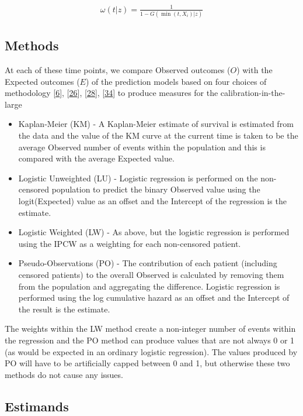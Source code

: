 \documentclass[12pt,PhD,twoside,openright]{muthesis}
\providecommand{\tightlist}{%
  \setlength{\itemsep}{0pt}\setlength{\parskip}{0pt}}
\begin{document}
\[
\begin{array}{c}
\omega(t|z) = \frac{1}{1 - G(\min(t,X_i)|z)}
\end{array}
\]

\hypertarget{methods-4}{%
\subsection{Methods}\label{methods-4}}

At each of these time points, we compare Observed outcomes (\(O\)) with the Expected outcomes (\(E\)) of the prediction models based on four choices of methodology {[}\protect\hyperlink{ref-riley_prognosis_2019}{6}{]}, {[}\protect\hyperlink{ref-royston_tools_2014}{26}{]}, {[}\protect\hyperlink{ref-royston_tools_2015}{28}{]}, {[}\protect\hyperlink{ref-andersen_pseudo-observations_2010}{34}{]} to produce measures for the calibration-in-the-large
\begin{itemize}
\tightlist
\item
  Kaplan-Meier (KM) - A Kaplan-Meier estimate of survival is estimated from the data and the value of the KM curve at the current time is taken to be the average Observed number of events within the population and this is compared with the average Expected value.
\item
  Logistic Unweighted (LU) - Logistic regression is performed on the non-censored population to predict the binary Observed value using the logit(Expected) value as an offset and the Intercept of the regression is the estimate.
\item
  Logistic Weighted (LW) - As above, but the logistic regression is performed using the IPCW as a weighting for each non-censored patient.
\item
  Pseudo-Observations (PO) - The contribution of each patient (including censored patients) to the overall Observed is calculated by removing them from the population and aggregating the difference. Logistic regression is performed using the log cumulative hazard as an offset and the Intercept of the result is the estimate.
\end{itemize}
The weights within the LW method create a non-integer number of events within the regression and the PO method can produce values that are not always 0 or 1 (as would be expected in an ordinary logistic regression). The values produced by PO will have to be artificially capped between 0 and 1, but otherwise these two methods do not cause any issues.

\hypertarget{estimands}{%
\subsection{Estimands}\label{estimands}}
\end{document}
